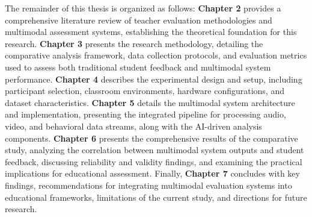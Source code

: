 The remainder of this thesis is organized as follows: \textbf{Chapter 2} provides a comprehensive literature review of teacher evaluation methodologies and multimodal assessment systems, establishing the theoretical foundation for this research. \textbf{Chapter 3} presents the research methodology, detailing the comparative analysis framework, data collection protocols, and evaluation metrics used to assess both traditional student feedback and multimodal system performance. \textbf{Chapter 4} describes the experimental design and setup, including participant selection, classroom environments, hardware configurations, and dataset characteristics. \textbf{Chapter 5} details the multimodal system architecture and implementation, presenting the integrated pipeline for processing audio, video, and behavioral data streams, along with the AI-driven analysis components. \textbf{Chapter 6} presents the comprehensive results of the comparative study, analyzing the correlation between multimodal system outputs and student feedback, discussing reliability and validity findings, and examining the practical implications for educational assessment. Finally, \textbf{Chapter 7} concludes with key findings, recommendations for integrating multimodal evaluation systems into educational frameworks, limitations of the current study, and directions for future research.

